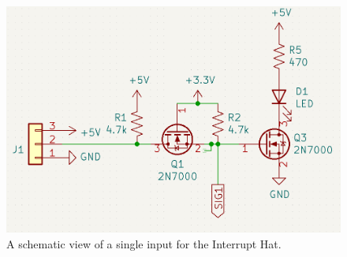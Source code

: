 \begin{figure}
\includegraphics{opa400/images/interrupt_schematic}
\caption[Interrupt Hat Schematic]{
	A schematic view of a single input for the Interrupt Hat.
}
\label{opa4:fig:interrupt_schematic}
\end{figure}


